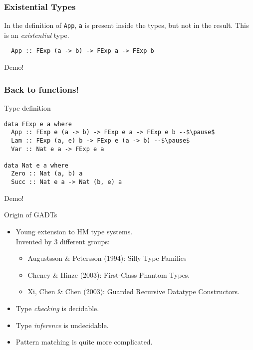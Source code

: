\documentclass[pdftex,aspectratio=169]{beamer}
\begin{document}
\begin{frame}[fragile]
  \frametitle{Existential Types}

  In the definition of \lstinline{App}, \lstinline{a} is present inside the types, but not in the result. This is an \emph{existential} type.
  \begin{block}{}
    \begin{lstlisting}
  App :: FExp (a -> b) -> FExp a -> FExp b      
    \end{lstlisting}
  \end{block}\pause
  Demo!
\end{frame}

\begin{frame}[fragile]
  \frametitle{Back to functions!}
  \begin{block}{Type definition}
  \begin{lstlisting}
data FExp e a where
  App :: FExp e (a -> b) -> FExp e a -> FExp e b --$\pause$
  Lam :: FExp (a, e) b -> FExp e (a -> b) --$\pause$
  Var :: Nat e a -> FExp e a

data Nat e a where
  Zero :: Nat (a, b) a
  Succ :: Nat e a -> Nat (b, e) a
\end{lstlisting}
\end{block}\pause
Demo!
\end{frame}

\begin{frame}{Origin of GADTs}
  \begin{itemize}
  \item<1-> Young extension to HM type systems.\\
    Invented by 3 different groups:
    \begin{itemize}
    \item Augustsson \& Petersson (1994): Silly Type Families
    \item Cheney \& Hinze (2003): First-Class Phantom Types.
    \item Xi, Chen \& Chen (2003): Guarded Recursive Datatype Constructors.
    \end{itemize}
  \item<2-> Type \emph{checking} is decidable.
  \item<3-> Type \emph{inference} is undecidable.
  \item<4-> Pattern matching is quite more complicated.
  \end{itemize}
  
\end{frame}
\end{document}
